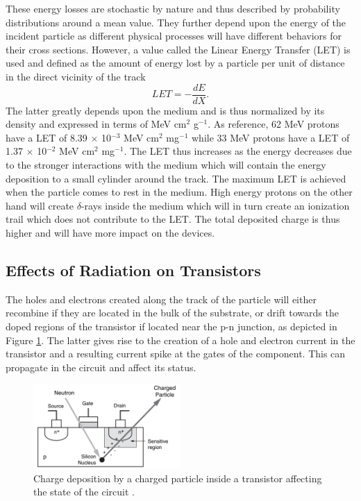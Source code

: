       These energy losses are stochastic by nature and thus described by probability distributions around a mean value. They further depend upon the energy of the incident particle as different physical processes will have different behaviors for their cross sections. However, a value called the Linear Energy Transfer (LET) is used and defined as the amount of energy lost by a particle per unit of distance in the direct vicinity of the track
      \begin{equation}
        LET = - \frac{dE}{dX} .
      \end{equation}
      The latter greatly depends upon the medium and is thus normalized by its density and expressed in terms of MeV cm$^2$ g$^{-1}$. As reference, 62 MeV protons have a LET of 8.39 $\times$ 10$^{-3}$ MeV cm$^2$ mg$^{-1}$ while 33 MeV protons have a LET of 1.37 $\times$ 10$^{-2}$ MeV cm$^2$ mg$^{-1}$. The LET thus increases as the energy decreases due to the stronger interactions with the medium which will contain the energy deposition to a small cylinder around the track. The maximum LET is achieved when the particle comes to rest in the medium. High energy protons on the other hand will create $\delta$-rays inside the medium which will in turn create an ionization trail which does not contribute to the LET. The total deposited charge is thus higher and will have more impact on the devices.

    \subsection{Effects of Radiation on Transistors}

      The holes and electrons created along the track of the particle will either recombine if they are located in the bulk of the substrate, or drift towards the doped regions of the transistor if located near the p-n junction, as depicted in Figure \ref{fig:II-5-transistor}. The latter gives rise to the creation of a hole and electron current in the transistor and a resulting current spike at the gates of the component. This can propagate in the circuit and affect its status. \\

      \begin{figure}[b!]
        \centering
        \includegraphics[width=0.5\textwidth]{img/II-5-irradiation/transistor.png}
        \caption{Charge deposition by a charged particle inside a transistor affecting the state of the circuit \cite{XILINX-RADIATION}.}
        \label{fig:II-5-transistor}
      \end{figure}

